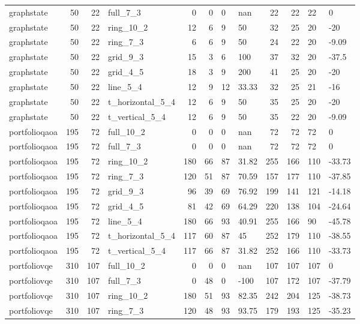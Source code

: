 \begin{longtable}{lrrlrrllrrll}
graphstate & 50 & 22 & full\_7\_3 & 0 & 0 & 0 & nan & 22 & 22 & 22 & 0 \\
graphstate & 50 & 22 & ring\_10\_2 & 12 & 6 & 9 & 50 & 32 & 25 & 20 & -20 \\
graphstate & 50 & 22 & ring\_7\_3 & 6 & 6 & 9 & 50 & 24 & 22 & 20 & -9.09 \\
graphstate & 50 & 22 & grid\_9\_3 & 15 & 3 & 6 & 100 & 37 & 32 & 20 & -37.5 \\
graphstate & 50 & 22 & grid\_4\_5 & 18 & 3 & 9 & 200 & 41 & 25 & 20 & -20 \\
graphstate & 50 & 22 & line\_5\_4 & 12 & 9 & 12 & 33.33 & 32 & 25 & 21 & -16 \\
graphstate & 50 & 22 & t\_horizontal\_5\_4 & 12 & 6 & 9 & 50 & 35 & 25 & 20 & -20 \\
graphstate & 50 & 22 & t\_vertical\_5\_4 & 12 & 6 & 9 & 50 & 35 & 22 & 20 & -9.09 \\
portfolioqaoa & 195 & 72 & full\_10\_2 & 0 & 0 & 0 & nan & 72 & 72 & 72 & 0 \\
portfolioqaoa & 195 & 72 & full\_7\_3 & 0 & 0 & 0 & nan & 72 & 72 & 72 & 0 \\
portfolioqaoa & 195 & 72 & ring\_10\_2 & 180 & 66 & 87 & 31.82 & 255 & 166 & 110 & -33.73 \\
portfolioqaoa & 195 & 72 & ring\_7\_3 & 120 & 51 & 87 & 70.59 & 157 & 177 & 110 & -37.85 \\
portfolioqaoa & 195 & 72 & grid\_9\_3 & 96 & 39 & 69 & 76.92 & 199 & 141 & 121 & -14.18 \\
portfolioqaoa & 195 & 72 & grid\_4\_5 & 81 & 42 & 69 & 64.29 & 220 & 138 & 104 & -24.64 \\
portfolioqaoa & 195 & 72 & line\_5\_4 & 180 & 66 & 93 & 40.91 & 255 & 166 & 90 & -45.78 \\
portfolioqaoa & 195 & 72 & t\_horizontal\_5\_4 & 117 & 60 & 87 & 45 & 252 & 179 & 110 & -38.55 \\
portfolioqaoa & 195 & 72 & t\_vertical\_5\_4 & 117 & 66 & 87 & 31.82 & 252 & 166 & 110 & -33.73 \\
portfoliovqe & 310 & 107 & full\_10\_2 & 0 & 0 & 0 & nan & 107 & 107 & 107 & 0 \\
portfoliovqe & 310 & 107 & full\_7\_3 & 0 & 48 & 0 & -100 & 107 & 172 & 107 & -37.79 \\
portfoliovqe & 310 & 107 & ring\_10\_2 & 180 & 51 & 93 & 82.35 & 242 & 204 & 125 & -38.73 \\
portfoliovqe & 310 & 107 & ring\_7\_3 & 120 & 48 & 93 & 93.75 & 179 & 193 & 125 & -35.23 \\

\end{longtable}
